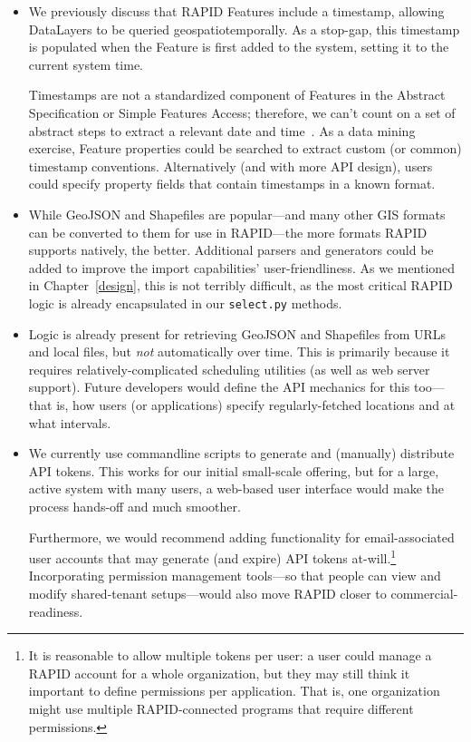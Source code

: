 \begin{itemize}

    \item We previously discuss that RAPID Features include a timestamp, allowing DataLayers to be queried geospatiotemporally. As a stop-gap, this timestamp is populated when the Feature is first added to the system, setting it to the current system time.
    
    Timestamps are not a standardized component of Features in the Abstract Specification or Simple Features Access; therefore, we can't count on a set of abstract steps to extract a relevant date and time~\cite{SFA}. As a data mining exercise, Feature properties could be searched to extract custom (or common) timestamp conventions. Alternatively (and with more API design), users could specify property fields that contain timestamps in a known format.
    
    \item While GeoJSON and Shapefiles are popular---and many other GIS formats can be converted to them for use in RAPID---the more formats RAPID supports natively, the better. Additional parsers and generators could be added to improve the import capabilities' user-friendliness. As we mentioned in Chapter~\ref{design}, this is not terribly difficult, as the most critical RAPID logic is already encapsulated in our \texttt{select.py} methods.
    
    \item Logic is already present for retrieving GeoJSON and Shapefiles from URLs and local files, but \textit{not} automatically over time. This is primarily because it requires relatively-complicated scheduling utilities (as well as web server support). Future developers would define the API mechanics for this too---that is, how users (or applications) specify regularly-fetched locations and at what intervals.
    
    \item We currently use commandline scripts to generate and (manually) distribute API tokens. This works for our initial small-scale offering, but for a large, active system with many users, a web-based user interface would make the process hands-off and much smoother.
    
    Furthermore, we would recommend adding functionality for email-associated user accounts that may generate (and expire) API tokens at-will.\footnote{It is reasonable to allow multiple tokens per user: a user could manage a RAPID account for a whole organization, but they may still think it important to define permissions per application. That is, one organization might use multiple RAPID-connected programs that require different permissions.} Incorporating permission management tools---so that people can view and modify shared-tenant setups---would also move RAPID closer to commercial-readiness.
    

\end{itemize}
